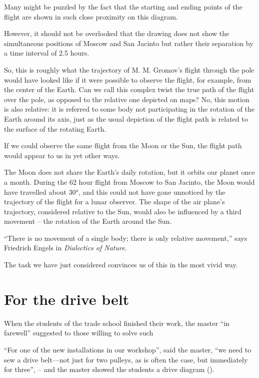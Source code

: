 Many might be puzzled by the fact that the starting and ending points of the flight are shown in such close proximity on this diagram.

However, it should not be overlooked that the drawing does not show the simultaneous positions of Moscow and San Jacinto but rather their separation by a time interval of 2.5 hours.

So, this is roughly what the trajectory of M. M. Gromov's flight through the pole would have looked like if it were possible to observe the flight, for example, from the center of the Earth. Can we call this complex twist the true path of the flight over the pole, as opposed to the relative one depicted on maps? No, this motion is also relative: it is referred to some body not participating in the rotation of the Earth around its axis, just as the usual depiction of the flight path is related to the surface of the rotating Earth.

If we could observe the same flight from the Moon or the Sun, the flight path would appear to us in yet other ways.

The Moon does not share the Earth's daily rotation, but it orbits our planet once a month. During the 62 hour flight from Moscow to San Jacinto, the Moon would have travelled about \ang{30}, and this could not have gone unnoticed by the trajectory of the flight for a lunar observer. The shape of the air plane's trajectory, considered relative to the Sun, would also be influenced by a third movement -- the rotation of the Earth around the Sun.

``There is no movement of a single body; there is only relative movement,'' says Friedrich Engels in \emph{Dialectics of Nature}.

The task we have just considered convinces us of this in the most vivid way.

\section{For the drive belt}
\label{sec-9.13}

When the students of the trade school finished their work, the master ``in farewell'' suggested to those willing to solve such

\ques ``For one of the new installations in our workshop'', said the master, ``we need to sew a drive belt—not just for two pulleys, as is often the case, but immediately for three'', -- and the master showed the students a drive diagram ().

